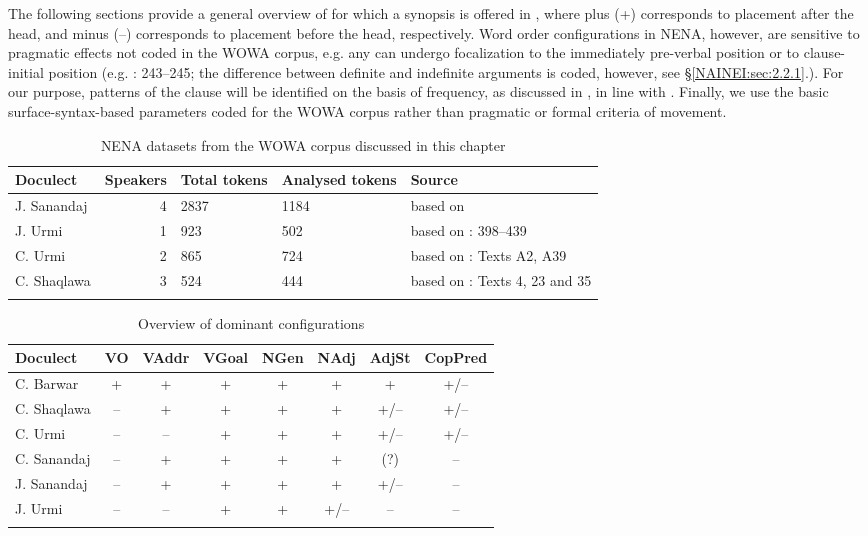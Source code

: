 \documentclass[output=paper,colorlinks,citecolor=brown,draftmode]{langscibook}
\begin{document}
The following sections provide a general overview of  for which a synopsis is offered in , where plus (+) corresponds to placement after the head, and minus (–) corresponds to placement before the head, respectively. Word order configurations in NENA, however, are sensitive to pragmatic effects not coded in the WOWA corpus, e.g. any  can undergo focalization to the immediately pre-verbal position or  to clause-initial position (e.g. \citealt{NoorlanderMolin2022WordOrder}: 243–245; the difference between definite and indefinite arguments is coded, however, see §\ref{NAINEI:sec:2.2.1}.). For our purpose,  patterns of the clause will be identified on the basis of frequency, as discussed in , in line with \parencite[73--78]{dryer_word_2007}. Finally, we use the basic surface-syntax-based parameters coded for the WOWA corpus rather than pragmatic or formal criteria of movement.

\begin{table}
    \begin{tabularx}{\textwidth}{lrR{1.5cm}R{1.8cm}Q}
\lsptoprule
\textbf{Doculect} & \textbf{Speakers} & \textbf{Total tokens} & \textbf{Analysed tokens} & \textbf{Source} \\
\midrule
J. Sanandaj & 4 & 2837 & 1184 & \citealt{Noorlander2022WOWAJSana} based on \citealt{Khan2009JSana} \\
\tablevspace
J. Urmi & 1 & 923 & 502 & \citealt{NoorlanderStilo2022JUrmi}  based on \citealt{Khan2008Barwar}: 398–439 \\
\tablevspace
C. Urmi & 2 & 865 & 724 & \citealt{Noorlander2022WOWACUrmi} based on \citealt{Khan2016CUrmi}: Texts A2, A39  \\
\tablevspace
C. Shaqlawa & 3 & 524 & 444 & \citealt{Noorlander2022WOWACShaqlawa}  based on \citealt{Khanetal2022FolkloreII}: Texts 4, 23 and 35 \\
\lspbottomrule
    \end{tabularx}
    \caption{NENA datasets from the WOWA corpus discussed in this chapter}
    \label{NAINEI:tab:1}
\end{table}


\begin{table}
    \begin{tabularx}{\textwidth}{Xccccccc}
\lsptoprule
\textbf{Doculect} & \textbf{VO} & \textbf{VAddr} & \textbf{VGoal} & \textbf{NGen} & \textbf{NAdj} & \textbf{AdjSt} & \textbf{CopPred} \\
\midrule
C. Barwar & + & + & + & + & + & + & +/– \\
C. Shaqlawa & – & + & + & + & + & +/– & +/– \\
C. Urmi & – & – & + & + & + & +/– & +/– \\
C. Sanandaj & – & + & + & + & + & (?) & – \\
J. Sanandaj & – & + & + & + & + & +/– & – \\
J. Urmi & – & – & + & + & +/– & – & – \\
\lspbottomrule
    \end{tabularx}
    \caption{Overview of dominant configurations }
    \label{NAINEI:tab:2}
\end{table}
\end{document}
